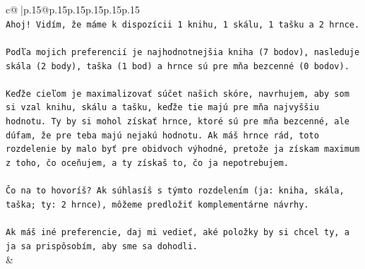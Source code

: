 \documentclass{article}
\begin{document}
{\begin{supertabular}{c@{$\;$}|p{.15\linewidth}@{}p{.15\linewidth}p{.15\linewidth}p{.15\linewidth}p{.15\linewidth}p{.15\linewidth}}
{{{\\ 
\texttt{Ahoj! Vidím, že máme k dispozícii 1 knihu, 1 skálu, 1 tašku a 2 hrnce.} \\
\\ 
\texttt{Podľa mojich preferencií je najhodnotnejšia kniha (7 bodov), nasleduje skála (2 body), taška (1 bod) a hrnce sú pre mňa bezcenné (0 bodov).} \\
\\ 
\texttt{Keďže cieľom je maximalizovať súčet našich skóre, navrhujem, aby som si vzal knihu, skálu a tašku, keďže tie majú pre mňa najvyššiu hodnotu. Ty by si mohol získať hrnce, ktoré sú pre mňa bezcenné, ale dúfam, že pre teba majú nejakú hodnotu. Ak máš hrnce rád, toto rozdelenie by malo byť pre obidvoch výhodné, pretože ja získam maximum z toho, čo oceňujem, a ty získaš to, čo ja nepotrebujem.} \\
\\ 
\texttt{Čo na to hovoríš? Ak súhlasíš s týmto rozdelením (ja: kniha, skála, taška; ty: 2 hrnce), môžeme predložiť komplementárne návrhy.} \\
\\ 
\texttt{Ak máš iné preferencie, daj mi vedieť, aké položky by si chcel ty, a ja sa prispôsobím, aby sme sa dohodli.} \\
            }
        }
    }
    & \\ \\


\end{supertabular}}
\end{document}
